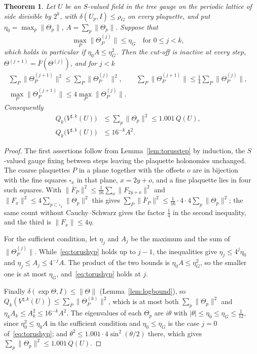 \documentclass[11pt]{amsart}
\newtheorem{theorem}{Theorem}[section]
\theoremstyle{definition}
\theoremstyle{remark}
\numberwithin{equation}{section}
\begin{document}
\begin{theorem}\label{thm:torusscales}
Let $U$ be an $S$-valued field in the tree gauge on the periodic lattice of
side divisible by $2^k$, with $\delta(U_p,I)\le\rho_G$ on every plaquette,
and put $\eta_0=\max_p\lVert\Theta_p\rVert$, $A=\sum_p\lVert\Theta_p\rVert$.
Suppose that
\begin{equation}\label{eq:torushyp}
\max_P\lVert\Theta^{(j)}_P\rVert\le\eta_G\quad\text{for }0\le j<k,
\end{equation}
which holds in particular if $\eta_0A\le\eta_G^2$. Then the cut-off is
inactive at every step, $\Theta^{(j+1)}=\bar F(\Theta^{(j)})$, and for
$j<k$
\begin{gather*}
\sum_P\lVert\Theta^{(j+1)}_P\rVert^2\le\sum_P\lVert\Theta^{(j)}_P\rVert^2,
\qquad\sum_P\lVert\Theta^{(j+1)}_P\rVert\le\frac14\sum_P\lVert
\Theta^{(j)}_P\rVert,\\
\max_P\lVert\Theta^{(j+1)}_P\rVert\le4\max_P\lVert\Theta^{(j)}_P\rVert.
\end{gather*}
Consequently
\begin{align*}
Q_k\bigl(V^{\sharp,k}(U)\bigr)&\le\sum_p\lVert\Theta_p\rVert^2\le1.001\,
Q(U),\\
Q_k\bigl(V^{\sharp,k}(U)\bigr)&\le16^{-k}A^2 .
\end{align*}
\end{theorem}

\begin{proof}
The first assertions follow from Lemma~\ref{lem:torusstep} by induction,
the $S$-valued gauge fixing between steps leaving the plaquette holonomies
unchanged. The coarse plaquettes $P$ in a plane together with the offsets
$o$ are in bijection with the fine squares $\square_x$ in that plane,
$x=2y+o$, and a fine plaquette lies in four such squares. With $\lVert\bar
F_P\rVert^2\le\frac1{16}\sum_o\lVert F_{2y+o}\rVert^2$ and $\lVert F_x
\rVert^2\le4\sum_{p\subset\square_x}\lVert\Theta_p\rVert^2$ this gives
$\sum_P\lVert\bar F_P\rVert^2\le\frac1{16}\cdot4\cdot4\sum_p\lVert\Theta_p
\rVert^2$; the same count without Cauchy--Schwarz gives the factor
$\frac14$ in the second inequality, and the third is $\lVert F_x\rVert\le
4\eta$.

For the sufficient condition, let $\eta_j$ and $A_j$ be the maximum and the
sum of $\lVert\Theta^{(j)}_P\rVert$. While~\eqref{eq:torushyp} holds up to
$j-1$, the inequalities give $\eta_j\le4^j\eta_0$ and $\eta_j\le A_j\le
4^{-j}A$. The product of the two bounds is $\eta_0A\le\eta_G^2$, so the
smaller one is at most $\eta_G$, and~\eqref{eq:torushyp} holds at $j$.

Finally $\delta(\exp\Theta,I)\le\lVert\Theta\rVert$
(Lemma~\ref{lem:logbound}), so $Q_k(V^{\sharp,k}(U))\le\sum_P\lVert
\Theta^{(k)}_P\rVert^2$, which is at most both $\sum_p\lVert\Theta_p
\rVert^2$ and $\eta_kA_k\le A_k^2\le16^{-k}A^2$. The eigenvalues of each
$\Theta_p$ are $i\theta$ with $|\theta|\le\eta_0\le\eta_G\le\frac1{12}$, since
$\eta_0^2\le\eta_0A$ in the sufficient condition and $\eta_0\le\eta_G$ is
the case $j=0$ of~\eqref{eq:torushyp}; and $\theta^2\le1.001\cdot4\sin^2(
\theta/2)$ there, which gives $\sum_p\lVert\Theta_p\rVert^2\le1.001\,Q(U)$.
\end{proof}
\end{document}
